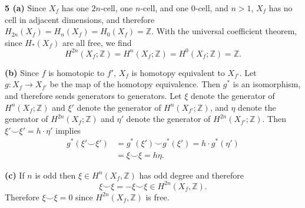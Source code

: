 \documentclass{article}
\makeatletter
\newcommand*{\shifttext}[1]{%
  \settowidth{\@tempdima}{#1}%
  \hspace{-\@tempdima}#1%
}
\newcommand{\plabel}[1]{%
\shifttext{\textbf{#1}\quad}%
}
\makeatother
\begin{document}
\plabel{5 (a)}%
Since $X_f$ has one $2n$-cell, one $n$-cell, and one $0$-cell, and $n>1$, $X_f$ has no cell in adjacent dimensions, and therefore $H_{2n}(X_f) = H_{n}(X_f) = H_0(X_f) = \mathbb{Z}$.
With the universal coefficient theorem, since $H_{*}(X_f)$ are all free, we find
\[ H^{2n}(X_f;\mathbb{Z}) = H^{n}(X_f;\mathbb{Z}) = H^{0}(X_f;\mathbb{Z}) = \mathbb{Z}. \]

\plabel{(b)}%
Since $f$ is homotopic to $f'$, $X_{f}$ is homotopy equivalent to $X_{f'}$.
Let $g:X_{f}\rightarrow X_{f'}$ be the map of the homotopy equivalence.
Then $g^*$ is an isomorphism, and therefore sends generators to generators.
Let $\xi$ denote the generator of $H^{n}(X_f;\mathbb{Z})$ and $\xi'$ denote the generator of $H^{n}(X_{f'};\mathbb{Z})$, and $\eta$ denote the generator of $H^{2n}(X_f;\mathbb{Z})$ and $\eta'$ denote the generator of $H^{2n}(X_{f'};\mathbb{Z})$.
Then $\xi'\smile \xi' = h\cdot \eta'$ implies
\begin{align*}
    g^*(\xi'\smile \xi') &= g^*(\xi')\smile g^*(\xi') = h \cdot g^*(\eta') \\
    &= \xi\smile \xi = h \eta.
\end{align*}

\plabel{(c)}%
If $n$ is odd then $\xi\in H^{n}(X_f,\mathbb{Z})$ has odd degree and therefore
\[ \xi\smile \xi = -\xi\smile \xi \in H^{2n}(X_f,\mathbb{Z}). \]
Therefore $\xi\smile\xi = 0$ since $H^{2n}(X_f,\mathbb{Z})$ is free.

% 
% 
\end{document}
